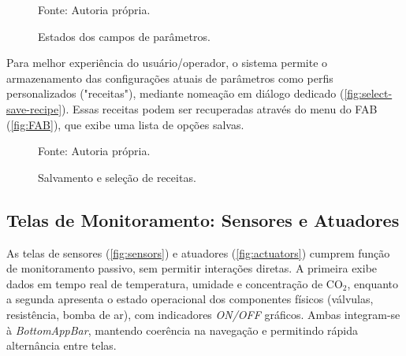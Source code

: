 \begin{figure}[ht]
    \caption{Estados dos campos de parâmetros.}
    \label{fig:parameters-state}
    \centering
    \hfill
    \hfill
    \hfill
    \hfill

    {\centering\footnotesize Fonte: Autoria própria.\par}

  \end{figure}


Para melhor experiência do usuário/operador, o sistema permite o armazenamento das configurações atuais de parâmetros como perfis personalizados ("receitas"), mediante nomeação em diálogo dedicado (\autoref{fig:select-save-recipe}). Essas receitas podem ser recuperadas através do menu do FAB (\autoref{fig:FAB}), que exibe uma lista de opções salvas.

\begin{figure}[ht]
    \caption{Salvamento e seleção de receitas.}
    \label{fig:select-save-recipe}
    \centering
    \hfill
    \hfill
    \hfill

    {\centering\footnotesize Fonte: Autoria própria.\par}

  \end{figure}

\subsection{Telas de Monitoramento: Sensores e Atuadores}\label{subsec:monitoramento}
As telas de sensores (\autoref{fig:sensors}) e atuadores (\autoref{fig:actuators}) cumprem função de monitoramento passivo, sem permitir interações diretas. A primeira exibe dados em tempo real de temperatura, umidade e concentração de CO$_2$, enquanto a segunda apresenta o estado operacional dos componentes físicos (válvulas, resistência, bomba de ar), com indicadores \textit{ON/OFF} gráficos. Ambas integram-se à \textit{BottomAppBar}, mantendo coerência na navegação e permitindo rápida alternância entre telas.

